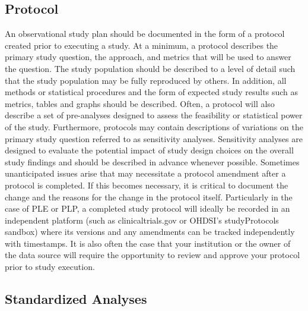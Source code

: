 \documentclass[11pt]{book}
\theoremstyle{definition}
\theoremstyle{definition}
\theoremstyle{definition}
\theoremstyle{remark}
\begin{document}
\subsection{Protocol}\label{protocol}


An observational study plan should be documented in the form of a
protocol created prior to executing a study. At a minimum, a protocol
describes the primary study question, the approach, and metrics that
will be used to answer the question. The study population should be
described to a level of detail such that the study population may be
fully reproduced by others. In addition, all methods or statistical
procedures and the form of expected study results such as metrics,
tables and graphs should be described. Often, a protocol will also
describe a set of pre-analyses designed to assess the feasibility or
statistical power of the study. Furthermore, protocols may contain
descriptions of variations on the primary study question referred to as
sensitivity analyses. Sensitivity analyses are designed to evaluate the
potential impact of study design choices on the overall study findings
and should be described in advance whenever possible. Sometimes
unanticipated issues arise that may necessitate a protocol amendment
after a protocol is completed. If this becomes necessary, it is critical
to document the change and the reasons for the change in the protocol
itself. Particularly in the case of PLE or PLP, a completed study
protocol will ideally be recorded in an independent platform (such as
clinicaltrials.gov or OHDSI's studyProtocols sandbox) where its versions
and any amendments can be tracked independently with timestamps. It is
also often the case that your institution or the owner of the data
source will require the opportunity to review and approve your protocol
prior to study execution.

\subsection{Standardized Analyses}\label{standardized-analyses}
\end{document}
